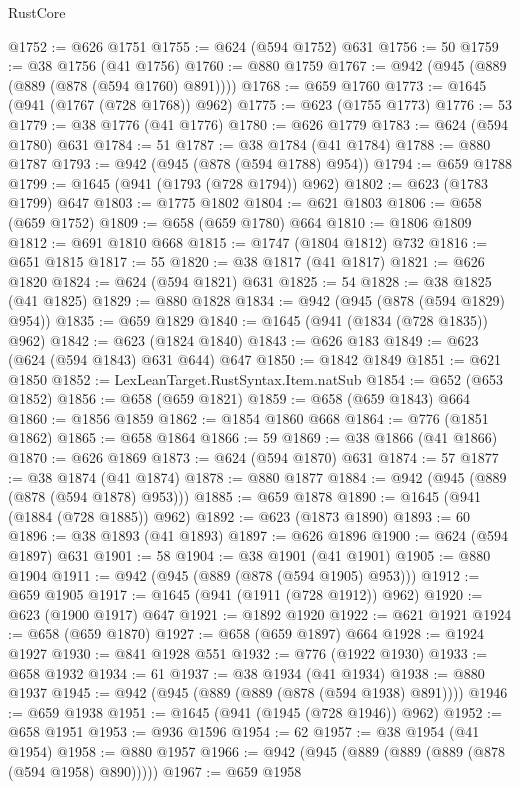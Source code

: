 \begin{lexlean}{RustCore}
\begin{coremodule}
@1752 := @626 @1751
@1755 := @624 (@594 @1752) @631
@1756 := 50
@1759 := @38 @1756 (@41 @1756)
@1760 := @880 @1759
@1767 := @942 (@945 (@889 (@889 (@878 (@594 @1760) @891))))
@1768 := @659 @1760
@1773 := @1645 (@941 (@1767 (@728 @1768)) @962)
@1775 := @623 (@1755 @1773)
@1776 := 53
@1779 := @38 @1776 (@41 @1776)
@1780 := @626 @1779
@1783 := @624 (@594 @1780) @631
@1784 := 51
@1787 := @38 @1784 (@41 @1784)
@1788 := @880 @1787
@1793 := @942 (@945 (@878 (@594 @1788) @954))
@1794 := @659 @1788
@1799 := @1645 (@941 (@1793 (@728 @1794)) @962)
@1802 := @623 (@1783 @1799) @647
@1803 := @1775 @1802
@1804 := @621 @1803
@1806 := @658 (@659 @1752)
@1809 := @658 (@659 @1780) @664
@1810 := @1806 @1809
@1812 := @691 @1810 @668
@1815 := @1747 (@1804 @1812) @732
@1816 := @651 @1815
@1817 := 55
@1820 := @38 @1817 (@41 @1817)
@1821 := @626 @1820
@1824 := @624 (@594 @1821) @631
@1825 := 54
@1828 := @38 @1825 (@41 @1825)
@1829 := @880 @1828
@1834 := @942 (@945 (@878 (@594 @1829) @954))
@1835 := @659 @1829
@1840 := @1645 (@941 (@1834 (@728 @1835)) @962)
@1842 := @623 (@1824 @1840)
@1843 := @626 @183
@1849 := @623 (@624 (@594 @1843) @631 @644) @647
@1850 := @1842 @1849
@1851 := @621 @1850
@1852 := LexLeanTarget.RustSyntax.Item.natSub
@1854 := @652 (@653 @1852)
@1856 := @658 (@659 @1821)
@1859 := @658 (@659 @1843) @664
@1860 := @1856 @1859
@1862 := @1854 @1860 @668
@1864 := @776 (@1851 @1862)
@1865 := @658 @1864
@1866 := 59
@1869 := @38 @1866 (@41 @1866)
@1870 := @626 @1869
@1873 := @624 (@594 @1870) @631
@1874 := 57
@1877 := @38 @1874 (@41 @1874)
@1878 := @880 @1877
@1884 := @942 (@945 (@889 (@878 (@594 @1878) @953)))
@1885 := @659 @1878
@1890 := @1645 (@941 (@1884 (@728 @1885)) @962)
@1892 := @623 (@1873 @1890)
@1893 := 60
@1896 := @38 @1893 (@41 @1893)
@1897 := @626 @1896
@1900 := @624 (@594 @1897) @631
@1901 := 58
@1904 := @38 @1901 (@41 @1901)
@1905 := @880 @1904
@1911 := @942 (@945 (@889 (@878 (@594 @1905) @953)))
@1912 := @659 @1905
@1917 := @1645 (@941 (@1911 (@728 @1912)) @962)
@1920 := @623 (@1900 @1917) @647
@1921 := @1892 @1920
@1922 := @621 @1921
@1924 := @658 (@659 @1870)
@1927 := @658 (@659 @1897) @664
@1928 := @1924 @1927
@1930 := @841 @1928 @551
@1932 := @776 (@1922 @1930)
@1933 := @658 @1932
@1934 := 61
@1937 := @38 @1934 (@41 @1934)
@1938 := @880 @1937
@1945 := @942 (@945 (@889 (@889 (@878 (@594 @1938) @891))))
@1946 := @659 @1938
@1951 := @1645 (@941 (@1945 (@728 @1946)) @962)
@1952 := @658 @1951
@1953 := @936 @1596
@1954 := 62
@1957 := @38 @1954 (@41 @1954)
@1958 := @880 @1957
@1966 := @942 (@945 (@889 (@889 (@889 (@878 (@594 @1958) @890)))))
@1967 := @659 @1958

\end{coremodule}
\end{lexlean}
